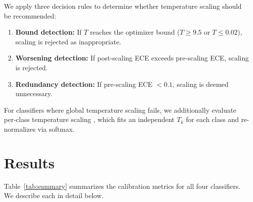 \documentclass[twocolumn]{aastex631}
\begin{document}
We apply three decision rules to determine whether temperature scaling should be recommended:
\begin{enumerate}
    \item \textbf{Bound detection:} If $T$ reaches the optimizer bound ($T \geq 9.5$ or $T \leq 0.02$), scaling is rejected as inappropriate.
    \item \textbf{Worsening detection:} If post-scaling ECE exceeds pre-scaling ECE, scaling is rejected.
    \item \textbf{Redundancy detection:} If pre-scaling ECE $< 0.1$, scaling is deemed unnecessary.
\end{enumerate}

For classifiers where global temperature scaling fails, we additionally evaluate per-class temperature scaling \citep{fang2020}, which fits an independent $T_k$ for each class and re-normalizes via softmax.


\section{Results} \label{sec:results}

Table~\ref{tab:summary} summarizes the calibration metrics for all four classifiers. We describe each in detail below.
\end{document}
